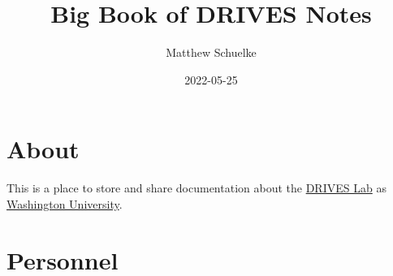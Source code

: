 \documentclass[
]{book}
\title{Big Book of DRIVES Notes}
\author{Matthew Schuelke}
\date{2022-05-25}
\begin{document}
\maketitle

{
\setcounter{tocdepth}{1}
\tableofcontents
}
\hypertarget{about}{%
\chapter{About}\label{about}}

This is a place to store and share documentation about the \href{https://roelab.wustl.edu}{DRIVES Lab} as \href{https://wustl.edu/}{Washington University}.

\hypertarget{personnel}{%
\chapter{Personnel}\label{personnel}}
\end{document}
